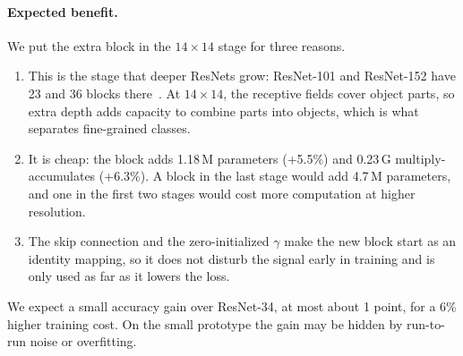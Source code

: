 \begin{table}[t]
  \centering
  \small
  \setlength{\tabcolsep}{4pt}
  \caption{ResNet-34 and our ResNet-36. The only difference is one extra basic block in the $14\times14$ stage.}
  \label{tab:p3-arch}
\end{table}

\paragraph{Expected benefit.}
We put the extra block in the $14\times14$ stage for three reasons.
\begin{enumerate}[nosep,leftmargin=*]
  \item This is the stage that deeper ResNets grow: ResNet-101 and ResNet-152 have 23 and 36 blocks there~\cite{he2016resnet}. At $14\times14$, the receptive fields cover object parts, so extra depth adds capacity to combine parts into objects, which is what separates fine-grained classes.
  \item It is cheap: the block adds 1.18\,M parameters (+5.5\%) and 0.23\,G multiply-accumulates (+6.3\%). A block in the last stage would add 4.7\,M parameters, and one in the first two stages would cost more computation at higher resolution.
  \item The skip connection and the zero-initialized $\gamma$ make the new block start as an identity mapping, so it does not disturb the signal early in training and is only used as far as it lowers the loss.
\end{enumerate}
We expect a small accuracy gain over ResNet-34, at most about 1 point, for a 6\% higher training cost.
On the small prototype the gain may be hidden by run-to-run noise or overfitting.

